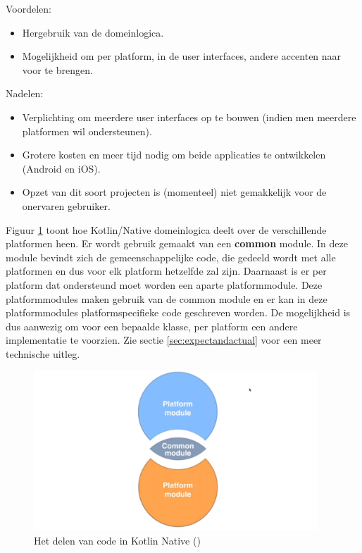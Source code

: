 Voordelen:
\begin{itemize}
	\item Hergebruik van de domeinlogica.
	\item Mogelijkheid om per platform, in de user interfaces, andere accenten naar voor te brengen.
\end{itemize}

Nadelen:
\begin{itemize}
	\item Verplichting om meerdere user interfaces op te bouwen (indien men meerdere platformen wil ondersteunen).
	\item Grotere kosten en meer tijd nodig om beide applicaties te ontwikkelen (Android en iOS).
	\item Opzet van dit soort projecten is (momenteel) niet gemakkelijk voor de onervaren gebruiker.
\end{itemize}

Figuur \ref{fig:sharingcode} toont hoe Kotlin/Native domeinlogica deelt over de verschillende platformen heen. Er wordt gebruik gemaakt van een \textbf{common} module. In deze module bevindt zich de gemeenschappelijke code, die gedeeld wordt met alle platformen en dus voor elk platform hetzelfde zal zijn. Daarnaast is er per platform dat ondersteund moet worden een aparte platformmodule. Deze platformmodules maken gebruik van de common module en er kan in deze platformmodules platformspecifieke code geschreven worden. De mogelijkheid is dus aanwezig om voor een bepaalde klasse, per platform een andere implementatie te voorzien. Zie sectie \ref{sec:expectandactual} voor een meer technische uitleg.

\begin{figure} [ht]
	\centering
	\includegraphics[width=0.95\textwidth]{img/sharingcode}
	\caption{Het delen van code in Kotlin Native (\cite{Developine})}
	\label{fig:sharingcode}
\end{figure}

